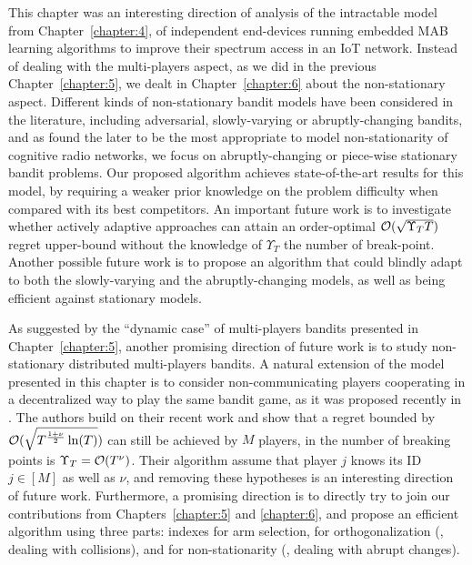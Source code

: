 This chapter was an interesting direction of analysis of the intractable model from Chapter~\ref{chapter:4}, of independent end-devices running embedded MAB learning algorithms to improve their spectrum access in an IoT network.
Instead of dealing with the multi-players aspect, as we did in the previous Chapter~\ref{chapter:5}, we dealt in Chapter~\ref{chapter:6} about the non-stationary aspect.
Different kinds of non-stationary bandit models have been considered in the literature, including adversarial, slowly-varying or abruptly-changing bandits, and as found the later to be the most appropriate to model non-stationarity of cognitive radio networks, we focus on abruptly-changing or piece-wise stationary bandit problems.
%
Our proposed algorithm achieves state-of-the-art results for this model, by requiring a weaker prior knowledge on the problem difficulty when compared with its best competitors.
An important future work is to investigate whether actively adaptive approaches can attain an order-optimal $\mathcal{O}(\sqrt{\Upsilon_T T})$ regret upper-bound without the knowledge of $\Upsilon_T$ the number of break-point.
%
Another possible future work is to propose an algorithm that could blindly adapt to both the slowly-varying and the abruptly-changing models, as well as being efficient against stationary models.


As suggested by the ``dynamic case'' of multi-players bandits presented in Chapter~\ref{chapter:5}, another promising direction of future work is to study non-stationary distributed multi-players bandits.
A natural extension of the model presented in this chapter is to consider non-communicating players cooperating in a decentralized way to play the same bandit game, as it was proposed recently in \cite{WeiSrivastava18Distributed}.
The authors build on their recent work \cite{WeiSrivastava18Abruptly} and show that a regret bounded by $\mathcal{O}(\sqrt{T^{\frac{1+\nu}{2}} \ln(T)})$ can still be achieved by $M$ players, in the number of breaking points is $\Upsilon_T = \mathcal{O}(T^{\nu})$.
Their algorithm assume that player $j$ knows its ID $j\in[M]$ as well as $\nu$, and removing these hypotheses is an interesting direction of future work.
Furthermore, a promising direction is to directly try to join our contributions from Chapters~\ref{chapter:5} and \ref{chapter:6}, and propose an efficient algorithm using three parts:
\klUCB{} indexes for arm selection,
\MCTopM{} for orthogonalization (\ie, dealing with collisions),
and \GLRklUCB{} for non-stationarity (\ie, dealing with abrupt changes).
%



